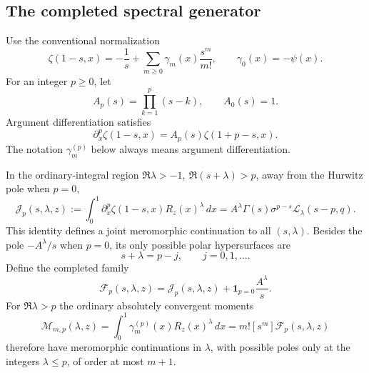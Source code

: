 \subsection{The completed spectral generator}

Use the conventional normalization
\[
 \zeta(1-s,x)=-\frac1s+
    \sum_{m\ge0}\gamma_m(x)\frac{s^m}{m!},
 \qquad \gamma_0(x)=-\psi(x).
\]
For an integer \(p\ge0\), let
\[
 A_p(s)=\prod_{k=1}^p(s-k),\qquad A_0(s)=1.
\]
Argument differentiation satisfies
\[
 \partial_x^p\zeta(1-s,x)
   =A_p(s)\zeta(1+p-s,x).
\]
The notation \(\gamma_m^{(p)}\) below always means argument
differentiation.

\begin{theorem}
\label{bhr:cxp:thm:generator}
In the ordinary-integral region
\(\Re\lambda>-1,\ \Re(s+\lambda)>p\), away from the Hurwitz
pole when \(p=0\),
\begin{equation}\label{bhr:cxp:eq:J}
 \mathcal J_p(s,\lambda,z):=
 \int_0^1\partial_x^p\zeta(1-s,x)R_z(x)^\lambda\,dx
 =A^\lambda\Gamma(s)\sigma^{p-s}
       \mathcal L_\lambda(s-p,q).
\end{equation}
This identity defines a joint meromorphic continuation to all
\((s,\lambda)\).  Besides the pole
\(-A^\lambda/s\) when \(p=0\), its only possible polar
hypersurfaces are
\[
 s+\lambda=p-j,\qquad j=0,1,\ldots.
\]
Define the completed family
\begin{equation}\label{bhr:cxp:eq:F}
 \mathcal F_p(s,\lambda,z)=
 \mathcal J_p(s,\lambda,z)
       +\mathbf1_{p=0}\frac{A^\lambda}{s}.
\end{equation}
For \(\Re\lambda>p\) the ordinary absolutely convergent moments
\begin{equation}\label{bhr:cxp:eq:M}
 \mathcal M_{m,p}(\lambda,z)=
 \int_0^1\gamma_m^{(p)}(x)R_z(x)^\lambda\,dx
 =m![s^m]\mathcal F_p(s,\lambda,z)
\end{equation}
therefore have meromorphic continuations in \(\lambda\), with
possible poles only at the integers \(\lambda\le p\), of order
at most \(m+1\).
\end{theorem}

